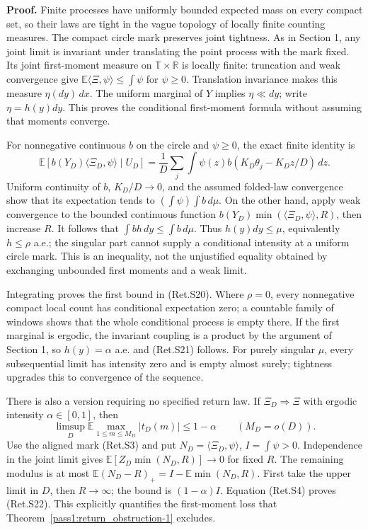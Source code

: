 \textbf{Proof.} Finite processes have uniformly bounded expected mass on every
compact set, so their laws are tight in the vague topology of locally finite
counting measures. The compact circle mark preserves joint tightness.
As in Section 1, any joint limit is invariant under translating the point
process with the mark fixed. Its joint first-moment measure on
\(\mathbb T\times\mathbb R\) is locally finite: truncation and weak convergence
give \(\mathbb E\langle\Xi,\psi\rangle\le\int\psi\) for \(\psi\ge0\).
Translation invariance makes this measure \(\eta(dy)\,dx\). The uniform marginal
of \(Y\) implies \(\eta\ll dy\); write \(\eta=h(y)dy\). This proves the conditional
first-moment formula without assuming that moments converge.

For nonnegative continuous \(b\) on the circle and \(\psi\ge0\), the exact
finite identity is
\[
 \mathbb E[b(Y_D)\langle\Xi_D,\psi\rangle\mid U_D]
 =\frac1D\sum_j\int\psi(z)b(K_D\theta_j-K_Dz/D)\,dz.
\]
Uniform continuity of \(b\), \(K_D/D\to0\), and the assumed folded-law
convergence show that its expectation tends to
\((\int\psi)\int b\,d\mu\). On the other hand, apply weak convergence to the
bounded continuous function
\(b(Y_D)\min(\langle\Xi_D,\psi\rangle,R)\), then increase \(R\).
It follows that \(\int b h\,dy\le\int b\,d\mu\).
Thus \(h(y)dy\le\mu\), equivalently \(h\le\rho\) a.e.; the singular part cannot
supply a conditional intensity at a uniform circle mark.
This is an inequality, not the unjustified equality obtained by exchanging
unbounded first moments and a weak limit.

Integrating proves the first bound in (Ret.S20). Where \(\rho=0\), every
nonnegative compact local count has conditional expectation zero; a countable
family of windows shows that the whole conditional process is empty there.
If the first marginal is ergodic, the invariant coupling is a product by the
argument of Section 1, so \(h(y)=\alpha\) a.e. and (Ret.S21) follows.
For purely singular \(\mu\), every subsequential limit has intensity zero and
is empty almost surely; tightness upgrades this to convergence of the sequence.

There is also a version requiring no specified return law. If
\(\Xi_D\Rightarrow\Xi\) with ergodic intensity \(\alpha\in[0,1]\), then
\[
 \limsup_D\mathbb E\max_{1\le m\le M_D}|t_D(m)|\le1-\alpha
                         \qquad(M_D=o(D)).                      \tag{Ret.S22}
\]
Use the aligned mark (Ret.S3) and put \(N_D=\langle\Xi_D,\psi\rangle\),
\(I=\int\psi>0\). Independence in the joint limit gives
\(\mathbb E[Z_D\min(N_D,R)]\to0\) for fixed \(R\).
The remaining modulus is at most
\(\mathbb E(N_D-R)_+=I-\mathbb E\min(N_D,R)\).
First take the upper limit in \(D\), then \(R\to\infty\); the bound is
\((1-\alpha)I\). Equation (Ret.S4) proves (Ret.S22). This explicitly quantifies the
first-moment loss that Theorem~\ref{pass1:return_obstruction-1} excludes.

